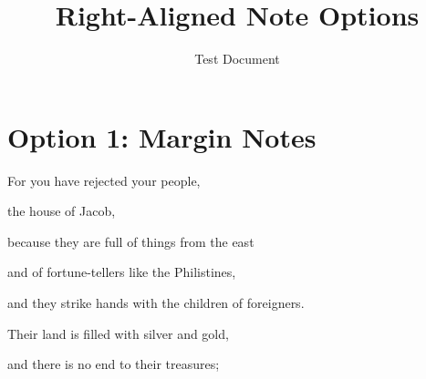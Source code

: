 \documentclass[11pt]{article}
\begin{document}
\title{Right-Aligned Note Options}
\author{Test Document}
\date{}
\maketitle

\section{Option 1: Margin Notes}
\begin{biblicaloutline}

\begin{versesection}[A]
 For you have rejected your people,

\poetryline the house of Jacob,

because they are full of things from the east

\poetryline and of fortune-tellers like the Philistines,

\poetryline and they strike hands with the children of foreigners.

 Their land is filled with silver and gold,

\poetryline and there is no end to their treasures;
\end{versesection}
\end{biblicaloutline}

\newpage
\end{document}
